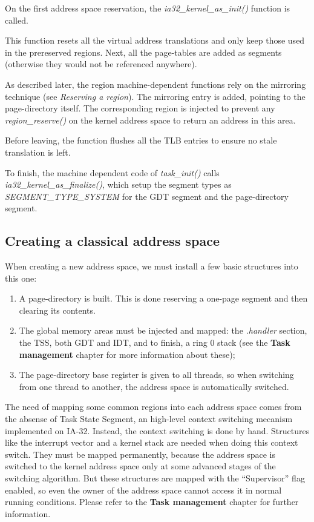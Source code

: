 On the first address space reservation, the
\textit{ia32\_kernel\_as\_init()} function is called.

This function resets all the virtual address translations and only
keep those used in the prereserved regions. Next, all the page-tables
are added as segments (otherwise they would not be referenced
anywhere).

As described later, the region machine-dependent functions rely on the
mirroring technique (see \textit{Reserving a region}). The mirroring
entry is added, pointing to the page-directory itself. The
corresponding region is injected to prevent any
\textit{region\_reserve()} on the kernel address space to return an
address in this area.

Before leaving, the function flushes all the TLB entries to ensure no
stale translation is left.

To finish, the machine dependent code of \textit{task\_init()} calls
\textit{ia32\_kernel\_as\_finalize()}, which setup the segment types
as \textit{SEGMENT\_TYPE\_SYSTEM} for the GDT segment and the
page-directory segment.

%
%

\subsection{Creating a classical address space}

When creating a new address space, we must install a few basic
structures into this one:

\begin{enumerate}
\item
  A page-directory is built. This is done reserving a one-page segment
  and then clearing its contents.
\item
  The global memory areas must be injected and mapped: the
  \textit{.handler} section, the TSS, both GDT and IDT, and to finish,
  a ring 0 stack (see the \textbf{Task management} chapter for more
  information about these);
\item
  The page-directory base register is given to all threads, so when
  switching from one thread to another, the address space is
  automatically switched.
\end{enumerate}

The need of mapping some common regions into each address space comes
from the absense of Task State Segment, an high-level context
switching mecanism implemented on IA-32. Instead, the context
switching is done by hand. Structures like the interrupt vector and a
kernel stack are needed when doing this context switch. They must be
mapped permanently, because the address space is switched to the
kernel address space only at some advanced stages of the switching
algorithm. But these structures are mapped with the ``Supervisor''
flag enabled, so even the owner of the address space cannot access it
in normal running conditions. Please refer to the \textbf{Task
management} chapter for further information.

